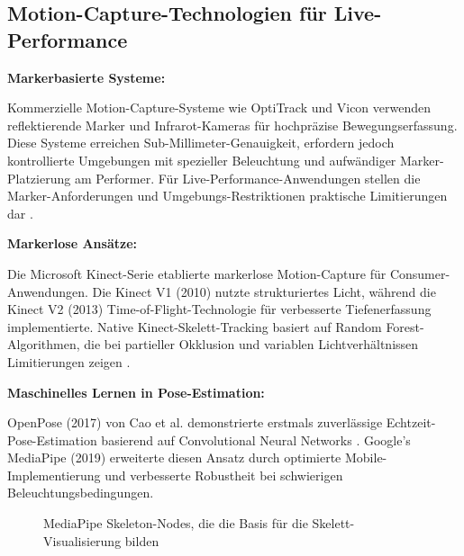 
\subsection{Motion-Capture-Technologien für Live-Performance}

\textbf{Markerbasierte Systeme:}

\raggedright Kommerzielle Motion-Capture-Systeme wie OptiTrack und Vicon verwenden reflektierende Marker und Infrarot-Kameras für hochpräzise Bewegungserfassung. Diese Systeme erreichen Sub-Millimeter-Genauigkeit, erfordern jedoch kontrollierte Umgebungen mit spezieller Beleuchtung und aufwändiger Marker-Platzierung am Performer. Für Live-Performance-Anwendungen stellen die Marker-Anforderungen und Umgebungs-Restriktionen praktische Limitierungen dar \cite{kitagawa2017mocap}.

\textbf{Markerlose Ansätze:}

\raggedright Die Microsoft Kinect-Serie etablierte markerlose Motion-Capture für Consumer-Anwendungen. Die Kinect V1 (2010) nutzte strukturiertes Licht, während die Kinect V2 (2013) Time-of-Flight-Technologie für verbesserte Tiefenerfassung implementierte. Native Kinect-Skelett-Tracking basiert auf Random Forest-Algorithmen, die bei partieller Okklusion und variablen Lichtverhältnissen Limitierungen zeigen \cite{shotton2011real}.

\textbf{Maschinelles Lernen in Pose-Estimation:}

\raggedright OpenPose (2017) von Cao et al. demonstrierte erstmals zuverlässige Echtzeit-Pose-Estimation basierend auf Convolutional Neural Networks \cite{cao2017realtime}. Google's MediaPipe (2019) erweiterte diesen Ansatz durch optimierte Mobile-Implementierung und verbesserte Robustheit bei schwierigen Beleuchtungsbedingungen.

\begin{figure}[htbp]
    \centering
    \caption{MediaPipe Skeleton-Nodes, die die Basis für die Skelett-Visualisierung bilden}
    \label{fig:mediapipe_nodes}
\end{figure}

